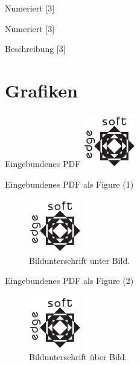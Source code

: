 \documentclass[t, aspectratio=169, ngerman]{beamer}
\begin{document}
	\begin{frame}{Numeriert}
		[3]
	\end{frame}

	\begin{frame}{Numeriert}
		[3]
	\end{frame}

	\begin{frame}{Beschreibung}
		[3]
	\end{frame}

	\section{Grafiken}

	\begin{frame}{Eingebundenes PDF}
		\includegraphics{testlogo}
	\end{frame}

	\begin{frame}{Eingebundenes PDF als Figure (1)}
		\begin{figure}
			\includegraphics{testlogo}
			\caption{Bildunterschrift unter Bild.}
		\end{figure}
	\end{frame}

	\begin{frame}{Eingebundenes PDF als Figure (2)}
		\begin{figure}
			\caption{Bildunterschrift über Bild.}
			\includegraphics{testlogo}
		\end{figure}
	\end{frame}
\end{document}
